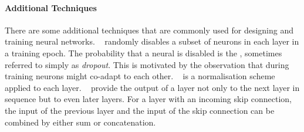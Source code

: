 \documentclass[
	fontsize=10pt, %
	twoside=true, %
	secnumdepth=1, %
  toc=indentunnumbered %
]{kaobook}
\begin{document}








\paragraph{Additional Techniques} There are some additional techniques that are
commonly used for designing and training neural networks.
~\cite{srivastava_dropout_nodate} randomly disables a subset
  of neurons in each layer in a training epoch. The probability that a neural is
  disabled is the , sometimes referred to simply as
  \textit{dropout}. This is motivated by the observation that during training
  neurons might co-adapt to each other.
~\cite{ioffe_batch_nodate} is a normalisation
  scheme applied to each layer.   
~\cite{he_deep_2015} provide the output of a layer
  not only to the next layer in sequence but to even later layers. For a layer
  with an incoming skip connection, the input of the previous layer and the
  input of the skip connection can be combined by either sum or concatenation.
\end{document}
